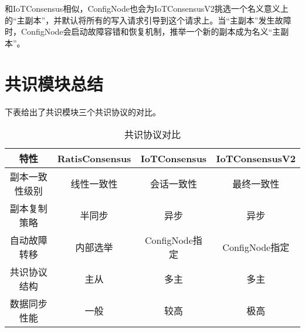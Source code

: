 和IoTConsensus相似，ConfigNode也会为IoTConsensusV2挑选一个名义意义上的“主副本”，并默认将所有的写入请求引导到这个请求上。当“主副本”发生故障时，ConfigNode会启动故障容错和恢复机制，推举一个新的副本成为名义“主副本”。


\section{共识模块总结}

下表给出了共识模块三个共识协议的对比。

\begin{table}
    \centering
    \caption{共识协议对比}
    \begin{tabular}{cccc}
      \toprule
      特性         & RatisConsensus & IoTConsensus &  IoTConsensusV2 \\
      \midrule
      副本一致性级别   & 线性一致性 & 会话一致性 &  最终一致性 \\
       副本复制策略    & 半同步    & 异步       & 异步       \\
       自动故障转移    &  内部选举    &   ConfigNode指定    &  ConfigNode指定  \\ 
      共识协议结构   & 主从 & 多主 &  多主  \\
      数据同步性能   & 一般 & 较高 &  极高  \\
      \bottomrule
    \end{tabular}
    \label{tab:consensus-compare}
  \end{table}



